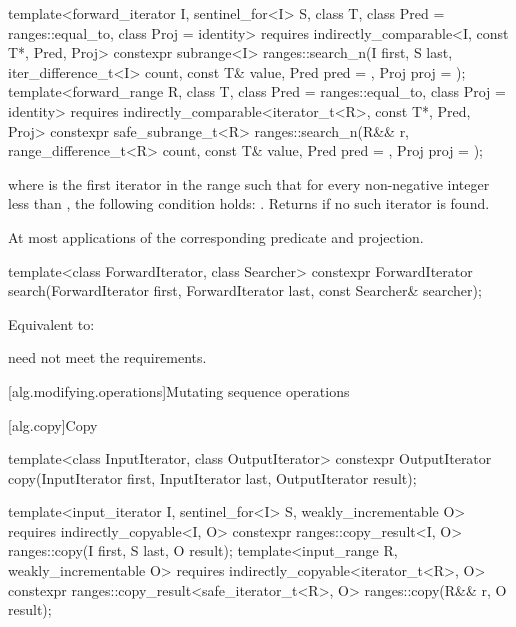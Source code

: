 %
\begin{itemdecl}
template<forward_iterator I, sentinel_for<I> S, class T,
         class Pred = ranges::equal_to, class Proj = identity>
  requires indirectly_comparable<I, const T*, Pred, Proj>
  constexpr subrange<I>
    ranges::search_n(I first, S last, iter_difference_t<I> count,
                     const T& value, Pred pred = {}, Proj proj = {});
template<forward_range R, class T, class Pred = ranges::equal_to,
         class Proj = identity>
  requires indirectly_comparable<iterator_t<R>, const T*, Pred, Proj>
  constexpr safe_subrange_t<R>
    ranges::search_n(R&& r, range_difference_t<R> count,
                     const T& value, Pred pred = {}, Proj proj = {});
\end{itemdecl}

\begin{itemdescr}
\pnum
\returns
{}
where  is the first iterator in the range 
such that for every non-negative integer  less than ,
the following condition holds:
.
Returns  if no such iterator is found.

\pnum
\complexity
At most  applications
of the corresponding predicate and projection.
\end{itemdescr}

%
\begin{itemdecl}
template<class ForwardIterator, class Searcher>
  constexpr ForwardIterator
    search(ForwardIterator first, ForwardIterator last, const Searcher& searcher);
\end{itemdecl}

\begin{itemdescr}
\pnum
\effects
Equivalent to: 

\pnum
\remarks
{} need not meet the  requirements.
\end{itemdescr}

[alg.modifying.operations]{Mutating sequence operations}

[alg.copy]{Copy}

%
\begin{itemdecl}
template<class InputIterator, class OutputIterator>
  constexpr OutputIterator copy(InputIterator first, InputIterator last,
                                OutputIterator result);

template<input_iterator I, sentinel_for<I> S, weakly_incrementable O>
  requires indirectly_copyable<I, O>
  constexpr ranges::copy_result<I, O> ranges::copy(I first, S last, O result);
template<input_range R, weakly_incrementable O>
  requires indirectly_copyable<iterator_t<R>, O>
  constexpr ranges::copy_result<safe_iterator_t<R>, O> ranges::copy(R&& r, O result);
\end{itemdecl}

